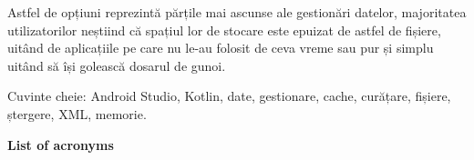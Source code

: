 \documentclass[12pt,a4paper,openany]{book}
\theoremstyle{definition}
\theoremstyle{remark}
\begin{document}
Astfel de opțiuni reprezintă părțile mai ascunse ale gestionări datelor, majoritatea utilizatorilor neștiind că spațiul lor de stocare este epuizat de astfel de fișiere, uitând de aplicațiile pe care nu le-au folosit de ceva vreme sau pur și simplu uitând să își golească dosarul de gunoi.

Cuvinte cheie: Android Studio, Kotlin, date, gestionare, cache, curățare, fișiere, ștergere, XML, memorie.
\newpage
\normalsize{}

\tableofcontents
\listoffigures

{\noindent \huge \textbf{List of acronyms}\par}

\begin{acronym}
\end{acronym}









\end{document}
